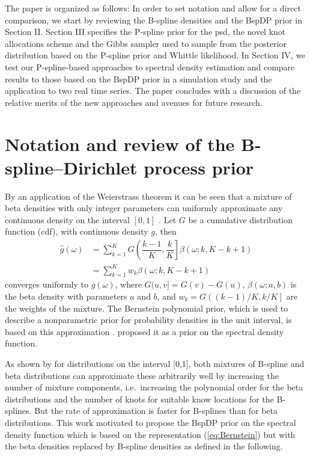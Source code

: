 \documentclass[twocolumn,final]{svjour3}
\newcommand{\pmr}{ \color{red}}
\begin{document}
The paper is organized as follows: In order to set notation and allow for a direct comparison, we start by
reviewing the B-spline densities and the BspDP prior in Section II. Section III specifies the P-spline prior for the psd, the novel knot allocations scheme and the Gibbs sampler used to sample from the posterior distribution based on the P-spline prior and Whittle likelihood.  In Section IV, we test our P-spline-based approaches to spectral density estimation and compare results to those based on the BspDP prior in a simulation study and the application to two real time series. The paper concludes with a discussion of the relative merits of the new approaches and avenues for future research.

\section{Notation and review of the B-spline--Dirichlet process prior}

By an application of the Weierstrass theorem it can be seen that a mixture of beta densities with only integer parameters can uniformly approximate any continuous density  on the interval $[0,1]$ \citep{Choudhuri:2004}.  Let $G$ be a cumulative distribution function (cdf), with continuous density $g$, then 
\begin{align}
\label{eq:Bernstein}
\widehat{g}(\omega) &= \sum_{k=1}^{K} G \left( \dfrac{k-1}{K} , \dfrac{k}{K} \right] \beta(\omega; k, K-k+1)\\
&= \sum_{k=1}^{K} w_k \beta(\omega; k, K-k+1) \nonumber
\end{align}	  
converges uniformly to $g(\omega)$, where $G(u,v] = G(v) - G(u)$, $\beta(\omega; a,b)$ is the beta density with parameters $a$ and $b$, and $w_k=G\left((k-1)/K, k/K \right]$ are the weights of the mixture.
The Bernstein polynomial prior, which is used to describe a nonparametric prior for probability densities in the unit interval, is based on this approximation \citep{Petrone:1999a,Petrone:199b}.  \cite{Choudhuri:2004} proposed it as a prior on the spectral density function.

{\pmr As shown by \cite{Perron:2001} for distributions on the interval [0,1], both mixtures of B-spline and beta distributions can approximate these arbitrarily well by increasing the number of mixture components, i.e.\ increasing the polynomial order for the beta distributions and the number of knots for suitable know locations for the B-splines. But the rate of approximation is faster for B-splines than for beta distributions.}
This work motivated \cite{Edwards2019} to propose the BspDP prior on the spectral density function which is based on the representation (\ref{eq:Bernstein}) but with
the beta densities replaced by B-spline densities as defined in the following.
\end{document}
